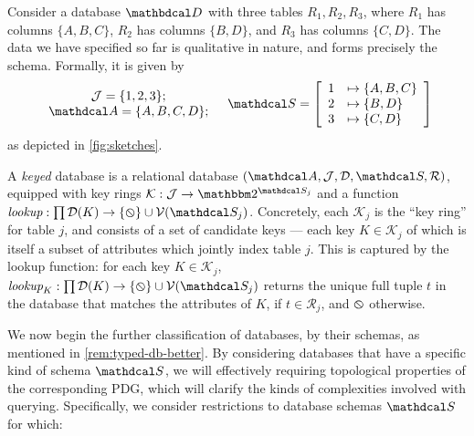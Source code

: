 \documentclass{article}
\theoremstyle{plain}
\theoremstyle{definition}
\theoremstyle{remark}
\newcommand\two{\mathbbm 2}
\newcommand{\D}{\mathbdcal D} %
\newcommand{\Attrs}{\mathdcal A}
\newcommand{\Idx}{\mathcal J}
\newcommand{\Doms}{{\mathcal D}}
\newcommand{\Rels}{{\mathcal R}}
\newcommand{\sch}{\mathdcal S}%
\newcommand{\arity}{\mathit{ar}}
\newcommand{\V}{\mathcal V}
\newcommand{\none}{\varobslash}
\begin{document}
\medskip
\begin{example}\label{ex:abcd}
	Consider a database $\D$ with three tables $R_1, R_2, R_3$, where $R_1$ has columns $\{A,B,C\}$, $R_2$ has columns $\{B,D\}$, and $R_3$ has columns $\{C,D\}$. The data we have specified so far is qualitative in nature, and forms precisely the schema.
	Formally, it is given by
	\[ 
	\begin{array}{c}
		\Idx = \{1,2,3\};\\
		\Attrs = \{A,B,C,D\};
	\end{array}
	\quad
		\sch = \left[\begin{array}{rl}
				1 &\mapsto \{A, B, C\} \\
				2 &\mapsto \{ B, D \} \\
				3 &\mapsto \{C, D\}
			\end{array}\right]
\] 
	as depicted in \cref{fig:sketches}.
\end{example}

\begin{defn}
	A \emph{keyed} database is a relational database $(\Attrs, \Idx, \Doms, \sch, \Rels)$, equipped with key rings $\mathcal K : \Idx \to \two^{\sch_j}$ and a function $\textit{lookup} : \prod\Doms(K) \to \{\none\} \cup \V(\sch_j)$. Concretely, each $\mathcal K_j$ is the ``key ring'' for table $j$, and consists of a set of candidate keys --- each key $K \in \mathcal K_j$ of which is itself a subset of attributes which jointly index table $j$. This is captured by the lookup function: for each key $K \in \mathcal K_j$, $\textit{lookup}_K : \prod\Doms(K) \to  \{\none\} \cup \V(\sch_j)$ returns the unique full tuple $t$ in the database that matches the attributes of $K$, if $t \in \mathcal R_j$, and $\none$ otherwise.
\end{defn}

We now begin the further classification of databases, by their schemas, as mentioned in \cref{rem:typed-db-better}.  
By considering databases that have a specific kind of schema $\sch$, we will effectively requiring topological properties of the corresponding PDG, which will clarify the kinds of complexities involved with querying. Specifically, we consider restrictions to database schemas $\sch$ for which:
\end{document}
